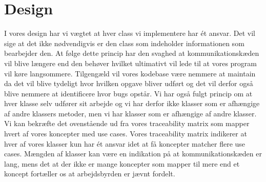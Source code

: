 \newpage

\section{Design}
I vores design har vi vægtet at hver class vi implementere har ét ansvar. Det vil sige at det ikke nødvendigvis er den class som indeholder informationen som bearbejder den. At følge dette princip har den svaghed at kommunikationskæden vil blive længere end den behøver hvilket ultimativt vil lede til at vores program vil køre langsommere. Tilgengæld vil vores kodebase være nemmere at maintain da det vil blive tydeligt hvor hvilken opgave bliver udført og det vil derfor også blive nemmere at identificere hvor bugs opstår. Vi har også fulgt princip om at hver klasse selv udfører sit arbejde og vi har derfor ikke klasser som er afhængige af andre klassers metoder, men vi har klasser som er afhængige af andre klasser.\\
Vi kan bekræfte det ovenstående ud fra vores traceability matrix som mapper hvert af vores koncepter med use cases. Vores traceability matrix indikerer at hver af vores klasser kun har ét ansvar idet at få koncepter matcher flere use cases. Mængden af klasser kan være en indikation på at kommunikationskæden er lang, mens det at der ikke er mange koncepter som mapper til mere end et koncept fortæller os at arbejdsbyrden er jævnt fordelt.\\

